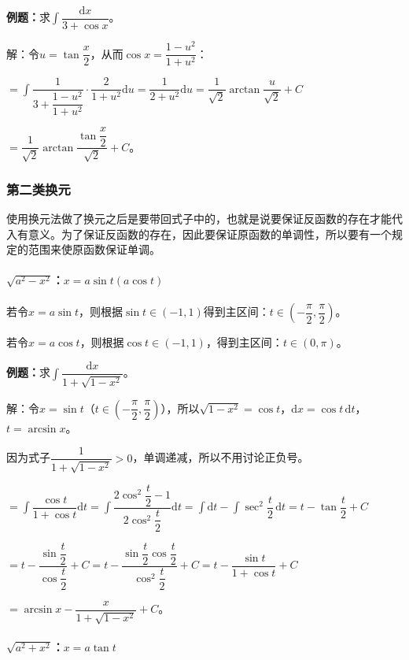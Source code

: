 \documentclass[UTF8, 12pt]{ctexart}
\begin{document}
\textbf{例题：}求$\displaystyle{\int\dfrac{\textrm{d}x}{3+\cos x}}$。

解：令$u=\tan\dfrac{x}{2}$，从而$\cos x=\dfrac{1-u^2}{1+u^2}$：

$=\displaystyle{\int\dfrac{1}{3+\dfrac{1-u^2}{1+u^2}}\cdot\dfrac{2}{1+u^2}\textrm{d}u=\dfrac{1}{2+u^2}\textrm{d}u=\dfrac{1}{\sqrt{2}}\arctan\dfrac{u}{\sqrt{2}}+C}$

$=\dfrac{1}{\sqrt{2}}\arctan\dfrac{\tan\dfrac{x}{2}}{\sqrt{2}}+C$。

\subsubsection{第二类换元}

使用换元法做了换元之后是要带回式子中的，也就是说要保证反函数的存在才能代入有意义。为了保证反函数的存在，因此要保证原函数的单调性，所以要有一个规定的范围来使原函数保证单调。

\paragraph{\texorpdfstring{$\sqrt{a^2-x^2}$：$x=a\sin t(a\cos t)$}\ } \leavevmode \medskip

若令$x=a\sin t$，则根据$\sin t\in(-1,1)$得到主区间：$t\in\left(-\dfrac{\pi}{2},\dfrac{\pi}{2}\right)$。

若令$x=a\cos t$，则根据$\cos t\in(-1,1)$，得到主区间：$t\in(0,\pi)$。

\textbf{例题：}求$\displaystyle{\int\dfrac{\textrm{d}x}{1+\sqrt{1-x^2}}}$。\medskip

解：令$x=\sin t$（$t\in\left(-\dfrac{\pi}{2},\dfrac{\pi}{2}\right)$），所以$\sqrt{1-x^2}=\cos t$，$\textrm{d}x=\cos t\,\textrm{d}t$，$t=\arcsin x$。

因为式子$\dfrac{1}{1+\sqrt{1-x^2}}>0$，单调递减，所以不用讨论正负号。

$=\displaystyle{\int\dfrac{\cos t}{1+\cos t}\textrm{d}t=\int\dfrac{2\cos^2\dfrac{t}{2}-1}{2\cos^2\dfrac{t}{2}}\textrm{d}t=\int\textrm{d}t-\int\sec^2\dfrac{t}{2}\,\textrm{d}t=t-\tan}\dfrac{t}{2}+C$

$=t-\dfrac{\sin\dfrac{t}{2}}{\cos\dfrac{t}{2}}+C=t-\dfrac{\sin\dfrac{t}{2}\cos\dfrac{t}{2}}{\cos^2\dfrac{t}{2}}+C=t-\dfrac{\sin t}{1+\cos t}+C$

$=\arcsin x-\dfrac{x}{1+\sqrt{1-x^2}}+C$。

\paragraph{\texorpdfstring{$\sqrt{a^2+x^2}$：$x=a\tan t$}\ } \leavevmode \medskip
\end{document}
